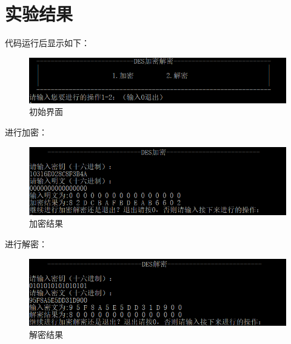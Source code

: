 \documentclass[UTF8,a4paper]{article}
\begin{document}
	\section{实验结果}
代码运行后显示如下：\par 
		\begin{figure}[!ht]
	
	\centering
	\includegraphics[width=1.0\textwidth]{p1.PNG}
	\caption{初始界面}
	\label{fig:p1}
\end{figure}
进行加密：\par 
		\begin{figure}[!ht]
	
	\centering
	\includegraphics[width=1.0\textwidth]{p2.PNG}
	\caption{加密结果}
	\label{fig:p2}
\end{figure}
进行解密：\par 
		\begin{figure}[!ht]
	
	\centering
	\includegraphics[width=1.0\textwidth]{p3.PNG}
	\caption{解密结果}
	\label{fig:p3}
\end{figure}
\end{document}
